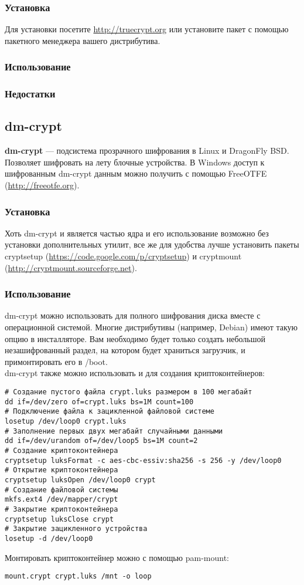 \subsubsection{Установка}
Для установки посетите \url{http://truecrypt.org} или установите пакет с помощью пакетного менеджера вашего дистрибутива.
\subsubsection{Использование}
\subsubsection{Недостатки}
\subsection{dm-crypt}
\textbf{dm-crypt} --- подсистема прозрачного шифрования в Linux и DragonFly BSD. Позволяет шифровать на лету блочные устройства. В Windows доступ к шифрованным dm-crypt данным можно получить с помощью FreeOTFE (\url{http://freeotfe.org}).
\subsubsection{Установка}
Хоть dm-crypt и является частью ядра и его использование возможно без установки дополнительных утилит, все же для удобства лучше установить пакеты cryptsetup (\url{https://code.google.com/p/cryptsetup}) и cryptmount (\url{http://cryptmount.sourceforge.net}).
\subsubsection{Использование}
dm-crypt можно использовать для полного шифрования диска вместе с операционной системой. Многие дистрибутивы (например, Debian) имеют такую опцию в инсталляторе. Вам необходимо будет только создать небольшой незашифрованный раздел, на котором будет храниться загрузчик, и примонтировать его в /boot.\\
dm-crypt также можно использовать и для создания криптоконтейнеров:
\begin{lstlisting}
# Создание пустого файла crypt.luks размером в 100 мегабайт
dd if=/dev/zero of=crypt.luks bs=1M count=100
# Подключение файла к зацикленной файловой системе
losetup /dev/loop0 crypt.luks
# Заполнение первых двух мегабайт случайными данными
dd if=/dev/urandom of=/dev/loop5 bs=1M count=2
# Создание криптоконтейнера
cryptsetup luksFormat -c aes-cbc-essiv:sha256 -s 256 -y /dev/loop0
# Открытие криптоконтейнера
cryptsetup luksOpen /dev/loop0 crypt
# Создание файловой системы
mkfs.ext4 /dev/mapper/crypt
# Закрытие криптоконтейнера
cryptsetup luksClose crypt
# Закрытие зацикленного устройства
losetup -d /dev/loop0
\end{lstlisting}
Монтировать криптоконтейнер можно с помощью pam-mount:
\begin{lstlisting}
mount.crypt crypt.luks /mnt -o loop
\end{lstlisting}
